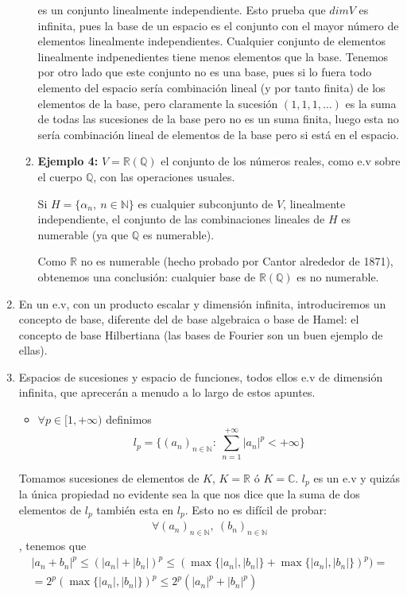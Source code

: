 \documentclass{article}
\begin{document}
\begin{enumerate}
\begin{enumerate}
	es un conjunto linealmente independiente. Esto prueba que $dim V$ es infinita, pues la base de un espacio es el conjunto con el mayor número de elementos linealmente independientes. Cualquier conjunto de elementos linealmente indpenedientes tiene menos elementos que la base. Tenemos por otro lado que este conjunto no es una base, pues si lo fuera todo elemento del espacio sería combinación lineal (y por tanto finita) de los elementos de la base, pero claramente la sucesión $(1,1,1,\ldots)$ es la suma de todas las sucesiones de la base pero no es un suma finita, luego esta no sería combinación lineal de elementos de la base pero si está en el espacio.
	
	\item \textbf{Ejemplo 4:} $V=\mathbb{R}(\mathbb{Q})$ el conjunto de los números reales, como e.v sobre el cuerpo $\mathbb{Q}$, con las operaciones usuales.
	
	Si $H=\{\alpha_n,\:n\in \mathbb{N}\}$ es cualquier subconjunto de $V$, linealmente independiente, el conjunto de las combinaciones lineales de $H$ es numerable (ya que $\mathbb{Q}$ es numerable). 
	
	Como $\mathbb{R}$ no es numerable (hecho probado por Cantor alrededor de 1871), obtenemos una conclusión: cualquier base de $\mathbb{R}(\mathbb{Q})$ es no numerable.
	\end{enumerate}
	
\item En un e.v, con un producto escalar y dimensión infinita, introduciremos un concepto de base, diferente del de base algebraica o base de Hamel: el concepto de base   Hilbertiana (las bases de Fourier son un buen ejemplo de ellas).

\item Espacios de sucesiones y espacio de funciones, todos ellos e.v de dimensión infinita, que aprecerán a menudo a lo largo de estos apuntes.
	\begin{itemize}
	\item $\forall p\in [1,+\infty)$ definimos
	\begin{equation*}
	l_p=\{(a_n)_{n\in\mathbb{N}}:\:\sum_{n=1}^{+\infty}|a_n|^p<+\infty\}
	\end{equation*}
	\end{itemize}
	
Tomamos sucesiones de elementos de $K$, $K=\mathbb{R}$ ó $K=\mathbb{C}$. $l_p$ es un e.v y quizás la única propiedad no evidente sea la que nos dice que la suma de dos elementos de $l_p$ también esta en $l_p$. Esto no es difícil de probar: 
\begin{gather*}
\forall(a_n)_{n\in\mathbb{N}},\:(b_n)_{n\in\mathbb{N}}
\end{gather*}
, tenemos que
\begin{gather*}
|a_n+b_n|^p\leq (|a_n|+|b_n|)^p\leq (\max\{|a_n|,|b_n|\}+\max\{|a_n|,|b_n|\})^p)=\\
=2^p(\max\{|a_n|,|b_n|\})^p\leq 2^p(|a_n|^p+|b_n|^p)
\end{gather*}


\end{enumerate}
\end{document}
